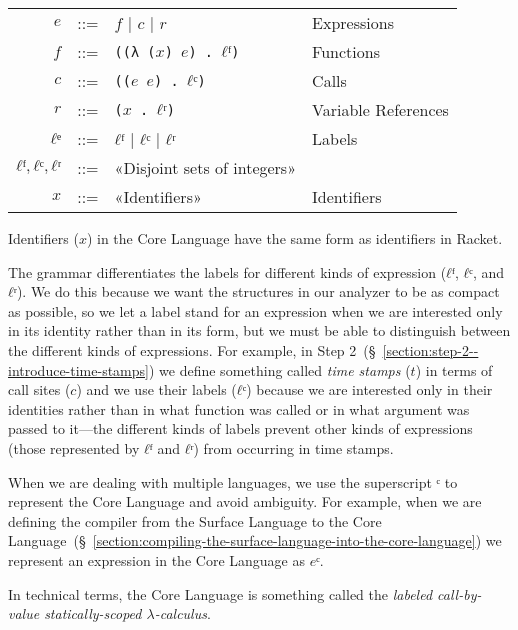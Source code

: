 \documentclass[12pt, oneside]{book}
\begin{document}
\begin{tabular}{rcll}
           \(e\) & ::= & \(f\) | \(c\) | \(r\)                 & Expressions         \\
           \(f\) & ::= & \texttt{((λ (\(x\)) \(e\)) . \(ℓᶠ\))} & Functions           \\
           \(c\) & ::= & \texttt{((\(e\) \(e\)) . \(ℓᶜ\))}     & Calls               \\
           \(r\) & ::= & \texttt{(\(x\) . \(ℓʳ\))}             & Variable References \\
          \(ℓᵉ\) & ::= & \(ℓᶠ\) | \(ℓᶜ\) | \(ℓʳ\)              & Labels              \\
  \(ℓᶠ, ℓᶜ, ℓʳ\) & ::= & «Disjoint sets of integers»           &                     \\
           \(x\) & ::= & «Identifiers»                         & Identifiers         \\
\end{tabular}

Identifiers (\(x\)) in the Core Language have the same form as identifiers in Racket.

The grammar differentiates the labels for different kinds of expression (\(ℓᶠ\), \(ℓᶜ\), and \(ℓʳ\)). We do this because we want the structures in our analyzer to be as compact as possible, so we let a label stand for an expression when we are interested only in its identity rather than in its form, but we must be able to distinguish between the different kinds of expressions. For example, in Step 2~(§~\ref{section:step-2--introduce-time-stamps}) we define something called \emph{time stamps} (\(t\)) in terms of call sites (\(c\)) and we use their labels (\(ℓᶜ\)) because we are interested only in their identities rather than in what function was called or in what argument was passed to it—the different kinds of labels prevent other kinds of expressions (those represented by \(ℓᶠ\) and \(ℓʳ\)) from occurring in time stamps.

When we are dealing with multiple languages, we use the superscript \(ᶜ\) to represent the Core Language and avoid ambiguity. For example, when we are defining the compiler from the Surface Language to the Core Language~(§~\ref{section:compiling-the-surface-language-into-the-core-language}) we represent an expression in the Core Language as \(eᶜ\).

In technical terms, the Core Language is something called the \emph{labeled call-by-value statically-scoped \(λ\)-calculus}.
\end{document}
